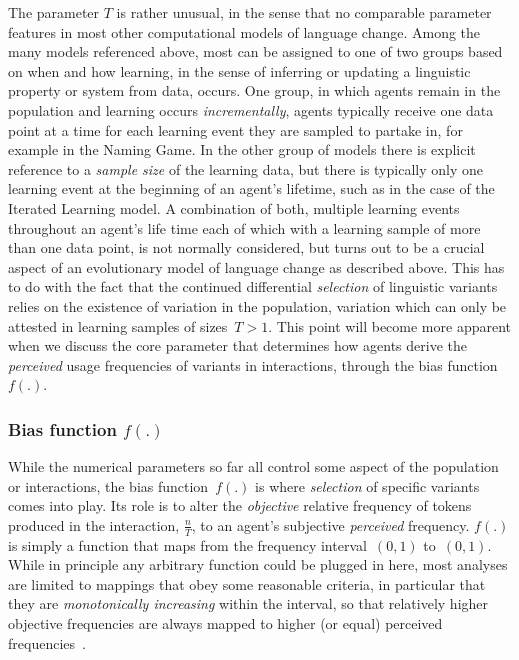 The parameter $T$ is rather unusual, in the sense that no comparable parameter features in most other computational models of language change. Among the many models referenced above, most can be assigned to one of two groups based on when and how learning, in the sense of inferring or updating a linguistic property or system from data, occurs. One group, in which agents remain in the population and learning occurs \emph{incrementally}, agents typically receive one data point at a time for each learning event they are sampled to partake in, for example in the Naming Game. In the other group of models there is explicit reference to a \emph{sample size} of the learning data, but there is typically only one learning event at the beginning of an agent's lifetime, such as in the case of the Iterated Learning model. %
A combination of both, multiple learning events throughout an agent's life time each of which with a learning sample of more than one data point, is not normally considered, but turns out to be a crucial aspect of an evolutionary model of language change as described above. This has to do with the fact that the continued differential \emph{selection} of linguistic variants relies on the existence of variation in the population, variation which can only be attested in learning samples of sizes~$T>1$. This point will become more apparent when we discuss the core parameter that determines how agents derive the \emph{perceived} usage frequencies of variants in interactions, through the bias function~$f(.)$.

\subsubsection{Bias function $f(.)$}

While the numerical parameters so far all control some aspect of the population or interactions, the bias function~$f(.)$ is where \emph{selection} of specific variants comes into play. Its role is to alter the \emph{objective} relative frequency of tokens produced in the interaction, $\frac{n}{T}$, to an agent's subjective \emph{perceived} frequency.
$f(.)$ is simply a function that maps from the frequency interval~$(0,1)$ to~$(0,1)$. While in principle any arbitrary function could be plugged in here, most analyses are limited to mappings that obey some reasonable criteria, in particular that they are \emph{monotonically increasing} within the interval, so that relatively higher objective frequencies are always mapped to higher (or equal) perceived frequencies~\citep{Blythe2012}.

